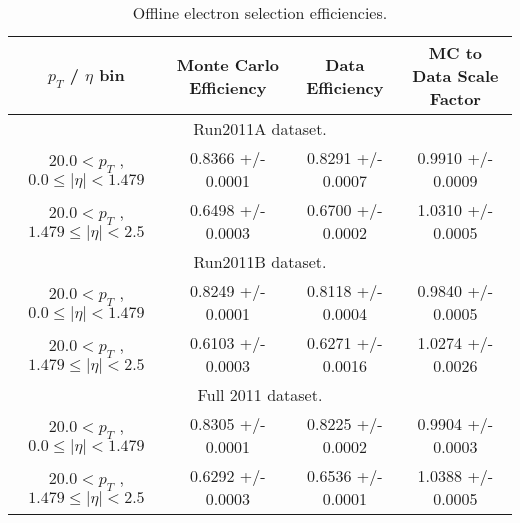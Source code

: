  \begin{table}[!ht]
 \begin{center}
 \begin{tabular}{|c|c|c|c|}
 \hline
 $p_{T}$ / $\eta$ bin    &  Monte Carlo Efficiency    &  Data Efficiency   &  MC to Data Scale Factor \\   
\hline
\multicolumn{4}{c}{Run2011A dataset.} \\ 
\hline
$ 20.0 < p_{T} $ , $  0.0  \le |\eta| <   1.479$   &       0.8366 +/- 0.0001   &       0.8291 +/- 0.0007   &       0.9910 +/- 0.0009   \\
\hline
$ 20.0 < p_{T} $ , $  1.479  \le |\eta| <   2.5$   &       0.6498 +/- 0.0003   &       0.6700 +/- 0.0002   &       1.0310 +/- 0.0005   \\
\hline
\multicolumn{4}{c}{Run2011B dataset.} \\ 
\hline
$ 20.0 < p_{T} $ , $  0.0  \le |\eta| <   1.479$   &       0.8249 +/- 0.0001   &       0.8118 +/- 0.0004   &       0.9840 +/- 0.0005   \\
\hline
$ 20.0 < p_{T} $ , $  1.479  \le |\eta| <   2.5$   &       0.6103 +/- 0.0003   &       0.6271 +/- 0.0016   &       1.0274 +/- 0.0026   \\
\hline
\multicolumn{4}{c}{Full 2011 dataset.} \\
\hline
$ 20.0 < p_{T} $ , $  0.0  \le |\eta| <   1.479$   &       0.8305 +/- 0.0001   &       0.8225 +/- 0.0002   &       0.9904 +/- 0.0003   \\
\hline
$ 20.0 < p_{T} $ , $  1.479  \le |\eta| <   2.5$   &       0.6292 +/- 0.0003   &       0.6536 +/- 0.0001   &       1.0388 +/- 0.0005   \\
\hline
\end{tabular}
\caption{Offline electron selection efficiencies.}
\label{tab:eff_ele_offline}
\end{center}
\end{table}

